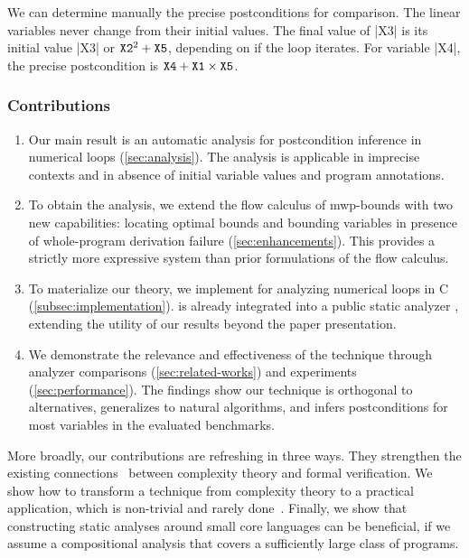 We can determine manually the precise postconditions for comparison.
The linear variables never change from their initial values.
The final value of \pr|X3| is its initial value \pr|X3| or \(\prm{X2}^2+\prm{X5}\), depending on if the loop iterates.
For variable \pr|X4|, the precise postcondition is \(\prm{X4}+\prm{X1}\times\prm{X5}\).

\subsubsection{Contributions}
\label{subsec:contributions}

\begin{enumerate}

\item Our main result is an automatic analysis for postcondition inference in numerical loops (\autoref{sec:analysis}).
The analysis is applicable in imprecise contexts and in absence of initial variable values and program annotations.

\item To obtain the analysis, we extend the flow calculus of mwp-bounds with two new capabilities:
locating optimal bounds and bounding variables in presence of whole-program derivation failure (\autoref{sec:enhancements}).
This provides a {strictly more expressive system} than prior formulations of the flow calculus.

\item To materialize our theory, we implement \ndx{\impl} for analyzing numerical loops in C (\autoref{subsec:implementation}).
\ndx{\impl} is already integrated into a public static analyzer , extending the utility of our results beyond the paper presentation.

\item We demonstrate the relevance and effectiveness of the technique through
analyzer comparisons (\autoref{sec:related-works}) and experiments (\autoref{sec:performance}).
The findings show our technique is orthogonal to alternatives,
generalizes to natural algorithms, and infers postconditions for most variables in the evaluated benchmarks.

\end{enumerate}

More broadly, our contributions are refreshing in three ways.
They strengthen the existing connections~\cite{nguyen2017,nguyen2014} {between} complexity theory and formal verification.
We show how to transform a technique from complexity theory to a practical application, which is non-trivial and rarely done~\cite{moyen2017,aubert20222}.
Finally, we show that constructing static analyses around small core languages %
can be beneficial, if we assume a {compositional} analysis that covers a sufficiently large class of programs.

